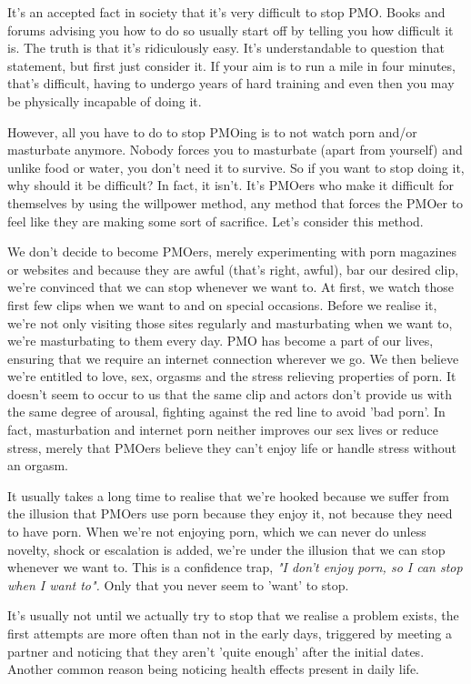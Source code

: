 \documentclass[easypeasy.tex]{subfiles}
\begin{document}
It's an accepted fact in society that it's very difficult to stop PMO. Books and forums advising you how to do so usually start off by telling you how difficult it is. The truth is that it's ridiculously easy. It's understandable to question that statement, but first just consider it. If your aim is to run a mile in four minutes, that's difficult, having to undergo years of hard training and even then you may be physically incapable of doing it.

However, all you have to do to stop PMOing is to not watch porn and/or masturbate anymore. Nobody forces you to masturbate (apart from yourself) and unlike food or water, you don't need it to survive. So if you want to stop doing it, why should it be difficult? In fact, it isn't. It's PMOers who make it difficult for themselves by using the willpower method, any method that forces the PMOer to feel like they are making some sort of sacrifice. Let's consider this method.

We don't decide to become PMOers, merely experimenting with porn magazines or websites and because they are awful (that's right, awful), bar our desired clip, we're convinced that we can stop whenever we want to. At first, we watch those first few clips when we want to and on special occasions. Before we realise it, we're not only visiting those sites regularly and masturbating when we want to, we're masturbating to them every day. PMO has become a part of our lives, ensuring that we require an internet connection wherever we go. We then believe we're entitled to love, sex, orgasms and the stress relieving properties of porn. It doesn't seem to occur to us that the same clip and actors don't provide us with the same degree of arousal, fighting against the red line to avoid 'bad porn'. In fact, masturbation and internet porn neither improves our sex lives or reduce stress, merely that PMOers believe they can't enjoy life or handle stress without an orgasm.

It usually takes a long time to realise that we're hooked because we suffer from the illusion that PMOers use porn because they enjoy it, not because they need to have porn. When we're not enjoying porn, which we can never do unless novelty, shock or escalation is added, we're under the illusion that we can stop whenever we want to. This is a confidence trap, \textit{"I don't enjoy porn, so I can stop when I want to".} Only that you never seem to 'want' to stop.

It's usually not until we actually try to stop that we realise a problem exists, the first attempts are more often than not in the early days, triggered by meeting a partner and noticing that they aren't 'quite enough' after the initial dates. Another common reason being noticing health effects present in daily life.
\end{document}
